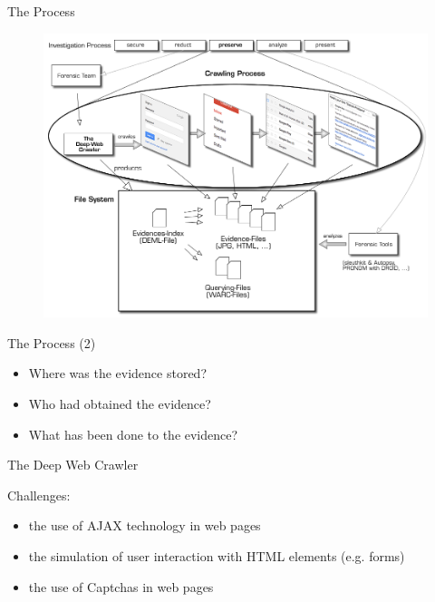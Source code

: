 \documentclass{beamer}
\begin{document}
\begin{frame}{The Process}

\begin{figure}
\includegraphics[scale=0.3]{figure-1.png}
\end{figure}

\end{frame}

\begin{frame}{The Process (2)}

\begin{itemize}
  \item Where was the evidence stored?
  \item Who had obtained the evidence?
  \item What has been done to the evidence?
\end{itemize}

\end{frame}

\begin{frame}{The Deep Web Crawler}

Challenges:

\begin{itemize}
  \item the use of AJAX technology in web pages
  \item the simulation of user interaction with HTML elements (e.g. forms)
  \item the use of Captchas in web pages
\end{itemize}

\end{frame}
\end{document}
